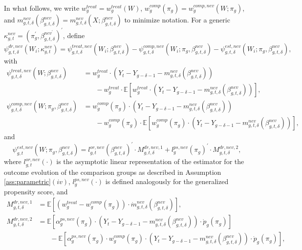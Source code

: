\documentclass[11pt]{article}%
\theoremstyle{plain}
\numberwithin{sassumption}{section}
\numberwithin{equation}{section}
\begin{document}
In what follows, we write $w_{g}^{treat}=w_{g}^{treat}\left(  W\right)  $,
$w_{g}^{comp}\left(  \pi_{g}\right)  =w_{g}^{comp,nev}\left(  W;\pi
_{g}\right)  $, and $m_{g,t,\delta}^{nev}\left(  \beta_{g,t,\delta}%
^{nev}\right)  =m_{g,t,\delta}^{nev}\left(  X;\beta_{g,t,\delta}^{nev}\right)
$ to minimize notation. For a generic $\kappa_{g,t}^{nev}=\left(  \pi
_{g}^{\prime},\beta_{g,t,\delta}^{nev^{\prime}}\right)  ^{\prime}$, define%
\begin{equation}
\psi_{g,t,\delta}^{dr,nev}(W_{i};\kappa_{g,t}^{nev})=\psi_{g,t,\delta
}^{treat,nev}(W_{i};\beta_{g,t,\delta}^{nev})-\psi_{g,t,\delta}^{comp,nev}%
(W_{i};\pi_{g},\beta_{g,t,\delta}^{nev})-\psi_{g,t,\delta}^{est,nev}(W_{i}%
;\pi_{g},\beta_{g,t,\delta}^{nev}), \label{eqn:psigt}%
\end{equation}
with
\begin{align*}
\psi_{g,t,\delta}^{treat,nev}(W;\beta_{g,t,\delta}^{nev})  &  =w_{g}%
^{treat}\cdot\left(  Y_{t}-Y_{g-\delta-1}-m_{g,t,\delta}^{nev}\left(
\beta_{g,t,\delta}^{nev}\right)  \right) \\
&  ~~~~~~~~-w_{g}^{treat}\cdot\mathbb{E}\left[  w_{g}^{treat}\cdot\left(
Y_{t}-Y_{g-\delta-1}-m_{g,t,\delta}^{nev}\left(  \beta_{g,t,\delta}%
^{nev}\right)  \right)  \right]  ,\\
\psi_{g,t,\delta}^{comp,nev}(W;\pi_{g},\beta_{g,t,\delta}^{nev})  &
=w_{g}^{comp}\left(  \pi_{g}\right)  \cdot\left(  Y_{t}-Y_{g-\delta
-1}-m_{g,t,\delta}^{nev}\left(  \beta_{g,t,\delta}^{nev}\right)  \right) \\
&  ~~~~~~~~-w_{g}^{comp}\left(  \pi_{g}\right)  \cdot\mathbb{E}\left[
w_{g}^{comp}\left(  \pi_{g}\right)  \cdot\left(  Y_{t}-Y_{g-\delta
-1}-m_{g,t,\delta}^{nev}\left(  \beta_{g,t,\delta}^{nev}\right)  \right)
\right]  ,
\end{align*}
and%
\[
\psi_{g,t}^{est,nev}(W;\pi_{g},\beta_{g,t,\delta}^{nev})=l_{g,t}%
^{or,nev}\left(  \beta_{g,t,\delta}^{nev}\right)  ^{\prime}\cdot
M_{g,t,\delta}^{dr,nev,1}+l_{g}^{ps,nev}\left(  \pi_{g}\right)  ^{\prime}\cdot
M_{g,t,\delta}^{dr,nev,2},
\]
where $l_{g,t}^{or,nev}\left(  \cdot\right)  $ is the asymptotic linear
representation of the estimator for the outcome evolution of the comparison
groups as described in Assumption \ref{ass:parametric}$\left(  iv\right)  $,
$l_{g}^{ps,nev}\left(  \cdot\right)  $ is defined analogously for the
generalized propensity score, and
\begin{align*}
M_{g,t,\delta}^{dr,nev,1}  &  =\mathbb{E}\left[  \left(  w_{g}^{treat}%
-w_{g}^{comp}\left(  \pi_{g}\right)  \right)  \cdot\dot{m}_{g,t,\delta}%
^{nev}\left(  \beta_{g,t,\delta}^{nev}\right)  \right]  ,\\
M_{g,t,\delta}^{dr,nev,2}  &  =\mathbb{E}\left[  \alpha_{g}^{ps,nev}\left(
\pi_{g}\right)  \cdot\left(  Y_{t}-Y_{g-\delta-1}-m_{g,t,\delta}^{nev}\left(
\beta_{g,t,\delta}^{nev}\right)  \right)  \cdot\dot{p}_{g}\left(  \pi
_{g}\right)  \right] \\
&  ~~~~~~~~-\mathbb{E}\left[  \alpha_{g}^{ps,nev}\left(  \pi_{g}\right)  \cdot
w_{g}^{comp}\left(  \pi_{g}\right)  \cdot\left(  Y_{t}-Y_{g-\delta
-1}-m_{g,t,\delta}^{nev}\left(  \beta_{g,t,\delta}^{nev}\right)  \right)
\cdot\dot{p}_{g}\left(  \pi_{g}\right)  \right]  ,
\end{align*}
\end{document}
